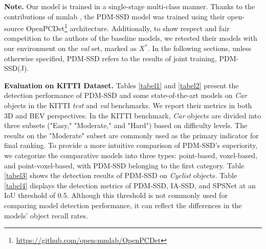 

\textbf{Note.} Our model is trained in a single-stage multi-class manner. Thanks to the contributions of mmlab \cite{openpcdet2020}, the PDM-SSD model was trained using their open-source OpenPCDet\footnote{\url{https://github.com/open-mmlab/OpenPCDet}} architecture. Additionally, to show respect and fair competition to the authors of the baseline models, we retested their models with our environment on the \textit{val} set, marked as $X^*$. In the following sections, unless otherwise specified, PDM-SSD refers to the results of joint training, PDM-SSD(J).



\textbf{Evaluation on KITTI Dataset.} Tables \ref{tabel1} and \ref{tabel2} present the detection performance of PDM-SSD and some state-of-the-art models on \textit{Car} objects in the KITTI \textit{test} and \textit{val} benchmarks. We report their metrics in both 3D and BEV perspectives. In the KITTI benchmark, \textit{Car} objects are divided into three subsets ("Easy," "Moderate," and "Hard") based on difficulty levels. The results on the "Moderate" subset are commonly used as the primary indicator for final ranking. To provide a more intuitive comparison of PDM-SSD's superiority, we categorize the comparative models into three types: point-based, voxel-based, and point-voxel-based, with PDM-SSD belonging to the first category. Table \ref{tabel3} shows the detection results of PDM-SSD on \textit{Cyclist} objects. Table \ref{tabel4} displays the detection metrics of PDM-SSD, IA-SSD, and SPSNet at an IoU threshold of 0.5. Although this threshold is not commonly used for comparing model detection performance, it can reflect the differences in the models' object recall rates.



